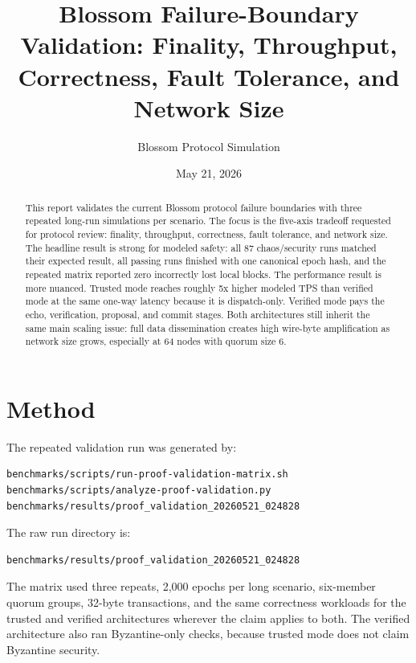 \documentclass[11pt]{article}
\title{Blossom Failure-Boundary Validation: Finality, Throughput, Correctness, Fault Tolerance, and Network Size}
\author{Blossom Protocol Simulation}
\date{May 21, 2026}
\begin{document}
\maketitle

\begin{abstract}
This report validates the current Blossom protocol failure boundaries with
three repeated long-run simulations per scenario. The focus is the five-axis
tradeoff requested for protocol review: finality, throughput, correctness,
fault tolerance, and network size. The headline result is strong for modeled
safety: all 87 chaos/security runs matched their expected result, all passing
runs finished with one canonical epoch hash, and the repeated matrix reported
zero incorrectly lost local blocks. The performance result is more nuanced.
Trusted mode reaches roughly 5x higher modeled TPS than verified mode at the
same one-way latency because it is dispatch-only. Verified mode pays the echo,
verification, proposal, and commit stages. Both architectures still inherit the
same main scaling issue: full data dissemination creates high wire-byte
amplification as network size grows, especially at 64 nodes with quorum size 6.
\end{abstract}

\section{Method}

The repeated validation run was generated by:

\begin{verbatim}
benchmarks/scripts/run-proof-validation-matrix.sh
benchmarks/scripts/analyze-proof-validation.py benchmarks/results/proof_validation_20260521_024828
\end{verbatim}

The raw run directory is:

\begin{verbatim}
benchmarks/results/proof_validation_20260521_024828
\end{verbatim}

The matrix used three repeats, 2,000 epochs per long scenario, six-member
quorum groups, 32-byte transactions, and the same correctness workloads for the
trusted and verified architectures wherever the claim applies to both. The
verified architecture also ran Byzantine-only checks, because trusted mode does
not claim Byzantine security.
\end{document}
